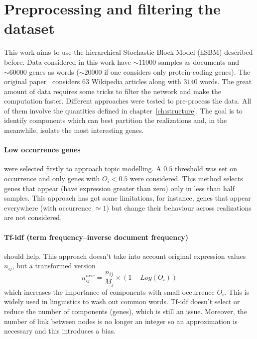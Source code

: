 \section{Preprocessing and filtering the dataset}
This work aims to use the hierarchical Stochastic Block Model (hSBM) described before. Data considered in this work have $\sim 11000$ samples as documents and $\sim 60000$ genes as words ($\sim 20000$ if one considers only protein-coding genes). The original paper~\cite{gerlach2018network} considers $63$ Wikipedia articles along with $3140$ words. The great amount of data requires some tricks to filter the network and make the computation faster.
Different approaches were tested to pre-process the data. All of them involve the quantities defined in chapter~\ref{ch:structure}. The goal is to identify components which can best partition the realizations and, in the meanwhile, isolate the most interesting genes.
 
\paragraph{Low occurrence genes} were selected firstly to approach topic modelling. A $0.5$ threshold was set on occurrence and only genes with $O_i<0.5$ were considered. This method selects genes that appear (have expression greater than zero) only in less than half samples. This approach has got some limitations, for instance, genes that appear everywhere (with occurrence $\simeq 1$) but change their behaviour across realizations are not considered.

\paragraph{Tf-idf (term frequency–inverse document frequency)} should help. This approach doesn't take into account original expression values $n_{ij}$, but a transformed version
\[
n^{new}_{ij}=\frac{n_{i j}}{M_j}\times \left(1-Log\left(O_i\right)\right)
\] which increases the importance of components with small occurrence $O_i$. This is widely used in linguistics to wash out common words. Tf-idf doesn't select or reduce the number of components (genes), which is still an issue. Moreover, the number of link between nodes is no longer an integer so an approximation is necessary and this introduces a bias.

